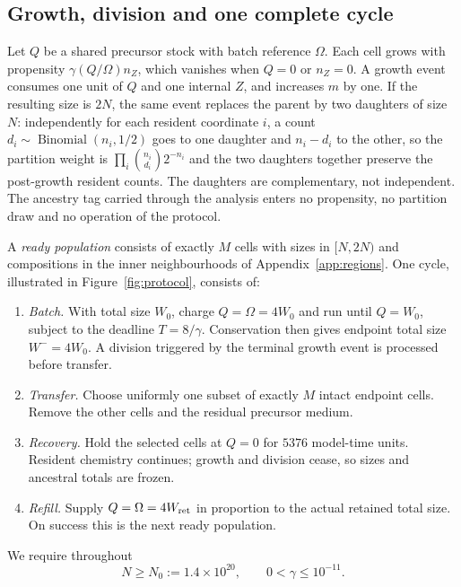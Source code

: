 \documentclass[11pt,a4paper]{article}
\theoremstyle{plain}
\theoremstyle{definition}
\theoremstyle{remark}
\begin{document}
\subsection{Growth, division and one complete cycle}\label{sec:cycle}

Let $Q$ be a shared precursor stock with batch reference $\Omega$. Each cell
grows with propensity $\gamma(Q/\Omega)n_Z$, which vanishes when $Q=0$ or
$n_Z=0$. A growth event consumes one unit of $Q$ and one internal $Z$, and
increases $m$ by one. If the resulting size is $2N$, the same event replaces the
parent by two daughters of size $N$: independently for each resident coordinate
$i$, a count $d_i\sim\operatorname{Binomial}(n_i,1/2)$ goes to one daughter and
$n_i-d_i$ to the other, so the partition weight is $\prod_i\binom{n_i}{d_i}2^{-n_i}$
and the two daughters together preserve the post-growth resident counts. The
daughters are complementary, not independent. The ancestry tag carried through
the analysis enters no propensity, no partition draw and no operation of the
protocol.

A \emph{ready population} consists of exactly $M$ cells with sizes in $[N,2N)$
and compositions in the inner neighbourhoods of Appendix~\ref{app:regions}. One
cycle, illustrated in Figure~\ref{fig:protocol}, consists of:

\begin{enumerate}
\item \emph{Batch.} With total size $W_0$, charge $Q=\Omega=4W_0$ and run until
$Q=W_0$, subject to the deadline $T=8/\gamma$. Conservation then gives endpoint
total size $W^-=4W_0$. A division triggered by the terminal growth event is
processed before transfer.
\item \emph{Transfer.} Choose uniformly one subset of exactly $M$ intact
endpoint cells. Remove the other cells and the residual precursor medium.
\item \emph{Recovery.} Hold the selected cells at $Q=0$ for $5376$ model-time
units. Resident chemistry continues; growth and division cease, so sizes and
ancestral totals are frozen.
\item \emph{Refill.} Supply $Q=\Omega=4W_{\rm ret}$ in proportion to the actual
retained total size. On success this is the next ready population.
\end{enumerate}

We require throughout
\begin{equation}\label{eq:admissible}
N\ge N_0:=1.4\times10^{20},\qquad 0<\gamma\le10^{-11}.
\end{equation}
\end{document}
